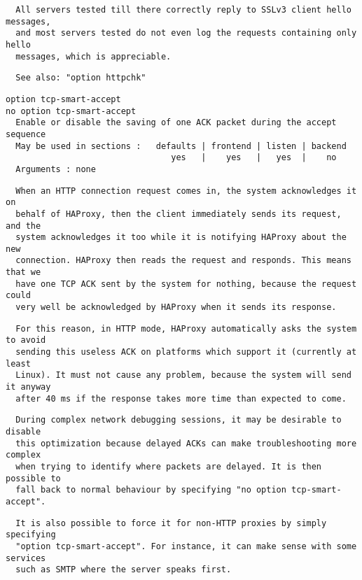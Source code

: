 \begin{verbatim}
  All servers tested till there correctly reply to SSLv3 client hello messages,
  and most servers tested do not even log the requests containing only hello
  messages, which is appreciable.
\end{verbatim}

\begin{verbatim}
  See also: "option httpchk"
\end{verbatim}

\begin{verbatim}
option tcp-smart-accept
no option tcp-smart-accept
  Enable or disable the saving of one ACK packet during the accept sequence
  May be used in sections :   defaults | frontend | listen | backend
                                 yes   |    yes   |   yes  |    no
  Arguments : none
\end{verbatim}

\begin{verbatim}
  When an HTTP connection request comes in, the system acknowledges it on
  behalf of HAProxy, then the client immediately sends its request, and the
  system acknowledges it too while it is notifying HAProxy about the new
  connection. HAProxy then reads the request and responds. This means that we
  have one TCP ACK sent by the system for nothing, because the request could
  very well be acknowledged by HAProxy when it sends its response.
\end{verbatim}

\begin{verbatim}
  For this reason, in HTTP mode, HAProxy automatically asks the system to avoid
  sending this useless ACK on platforms which support it (currently at least
  Linux). It must not cause any problem, because the system will send it anyway
  after 40 ms if the response takes more time than expected to come.
\end{verbatim}

\begin{verbatim}
  During complex network debugging sessions, it may be desirable to disable
  this optimization because delayed ACKs can make troubleshooting more complex
  when trying to identify where packets are delayed. It is then possible to
  fall back to normal behaviour by specifying "no option tcp-smart-accept".
\end{verbatim}

\begin{verbatim}
  It is also possible to force it for non-HTTP proxies by simply specifying
  "option tcp-smart-accept". For instance, it can make sense with some services
  such as SMTP where the server speaks first.
\end{verbatim}

